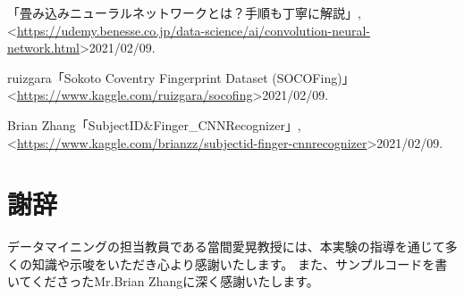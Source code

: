 \documentclass[a4paper, 11pt, titlepage]{jsarticle}
\begin{document}

\begin{thebibliography}{n}
「畳み込みニューラルネットワークとは？手順も丁寧に解説」, \\
  \textless \url{https://udemy.benesse.co.jp/data-science/ai/convolution-neural-network.html}\textgreater 2021/02/09.
  
  ruizgara「Sokoto Coventry Fingerprint Dataset (SOCOFing)」\\
  \textless \url{https://www.kaggle.com/ruizgara/socofing}\textgreater 2021/02/09.
  
  Brian Zhang「SubjectID\&Finger\_CNNRecognizer」, \\
  \textless \url{https://www.kaggle.com/brianzz/subjectid-finger-cnnrecognizer}\textgreater 2021/02/09.
  
\end{thebibliography}

\section*{謝辞}
データマイニングの担当教員である當間愛晃教授には、本実験の指導を通じて多くの知識や示唆をいただき心より感謝いたします。
また、サンプルコードを書いてくださったMr.Brian Zhangに深く感謝いたします。
\end{document}
